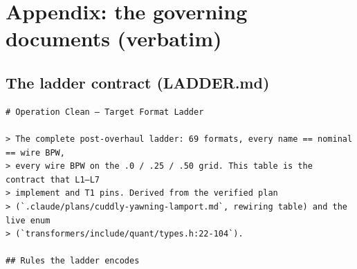 \chapter{Appendix: the governing documents (verbatim)}


\section*{The ladder contract (LADDER.md)}
\begin{verbatim}
# Operation Clean — Target Format Ladder

> The complete post-overhaul ladder: 69 formats, every name == nominal == wire BPW,
> every wire BPW on the .0 / .25 / .50 grid. This table is the contract that L1–L7
> implement and T1 pins. Derived from the verified plan
> (`.claude/plans/cuddly-yawning-lamport.md`, rewiring table) and the live enum
> (`transformers/include/quant/types.h:22-104`).

## Rules the ladder encodes



\end{verbatim}
